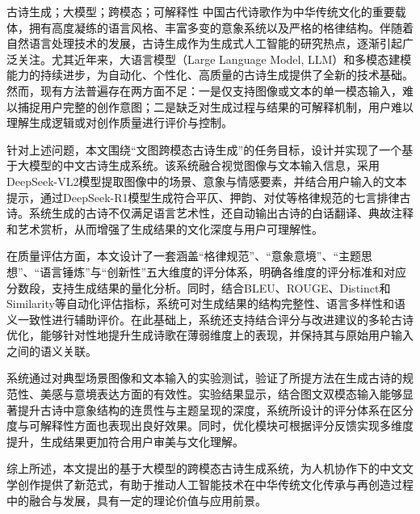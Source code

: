 
\begin{cnabstract}{古诗生成；大模型；跨模态；可解释性}
中国古代诗歌作为中华传统文化的重要载体，拥有高度凝练的语言风格、丰富多变的意象系统以及严格的格律结构。伴随着自然语言处理技术的发展，古诗生成作为生成式人工智能的研究热点，逐渐引起广泛关注。尤其近年来，大语言模型（Large Language Model, LLM）和多模态建模能力的持续进步，为自动化、个性化、高质量的古诗生成提供了全新的技术基础。然而，现有方法普遍存在两方面不足：一是仅支持图像或文本的单一模态输入，难以捕捉用户完整的创作意图；二是缺乏对生成过程与结果的可解释机制，用户难以理解生成逻辑或对创作质量进行评价与控制。

针对上述问题，本文围绕“文图跨模态古诗生成”的任务目标，设计并实现了一个基于大模型的中文古诗生成系统。该系统融合视觉图像与文本输入信息，采用DeepSeek-VL2模型提取图像中的场景、意象与情感要素，并结合用户输入的文本提示，通过DeepSeek-R1模型生成符合平仄、押韵、对仗等格律规范的七言排律古诗。系统生成的古诗不仅满足语言艺术性，还自动输出古诗的白话翻译、典故注释和艺术赏析，从而增强了生成结果的文化深度与用户可理解性。

在质量评估方面，本文设计了一套涵盖“格律规范”、“意象意境”、“主题思想”、“语言锤炼”与“创新性”五大维度的评分体系，明确各维度的评分标准和对应分数段，支持生成结果的量化分析。同时，结合BLEU、ROUGE、Distinct和Similarity等自动化评估指标，系统可对生成结果的结构完整性、语言多样性和语义一致性进行辅助评价。在此基础上，系统还支持结合评分与改进建议的多轮古诗优化，能够针对性地提升生成诗歌在薄弱维度上的表现，并保持其与原始用户输入之间的语义关联。

系统通过对典型场景图像和文本输入的实验测试，验证了所提方法在生成古诗的规范性、美感与意境表达方面的有效性。实验结果显示，结合图文双模态输入能够显著提升古诗中意象结构的连贯性与主题呈现的深度，系统所设计的评分体系在区分度与可解释性方面也表现出良好效果。同时，优化模块可根据评分反馈实现多维度提升，生成结果更加符合用户审美与文化理解。

综上所述，本文提出的基于大模型的跨模态古诗生成系统，为人机协作下的中文文学创作提供了新范式，有助于推动人工智能技术在中华传统文化传承与再创造过程中的融合与发展，具有一定的理论价值与应用前景。
  
\end{cnabstract}


